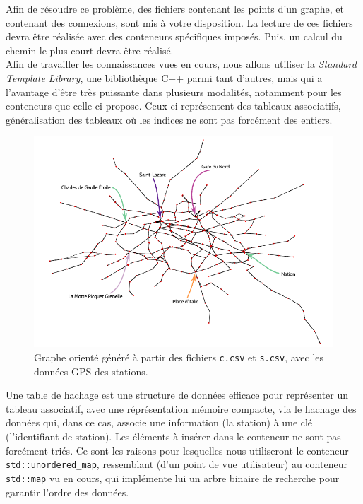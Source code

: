 \documentclass[9pts]{article}
\begin{document}
Afin de résoudre ce problème, des fichiers contenant les points d'un graphe, et contenant des connexions, sont mis à votre disposition. La lecture de ces fichiers devra être réalisée avec des conteneurs spécifiques imposés. Puis, un calcul du chemin le plus court devra être réalisé.\\

Afin de travailler les connaissances vues en cours, nous allons utiliser la \emph{Standard Template Library}, une bibliothèque C++ parmi tant d'autres, mais qui a l'avantage d'être très puissante dans plusieurs modalités, notamment pour les conteneurs que celle-ci propose. Ceux-ci représentent des tableaux associatifs, généralisation des tableaux où les indices ne sont pas forcément des entiers.\\

\begin{figure}[h]
   \centering
   \includegraphics[width=18cm,keepaspectratio]{ratp_graph.pdf}
   \caption{\label{directed_graph} Graphe orienté généré à partir des fichiers \texttt{c.csv} et \texttt{s.csv}, avec les données GPS des stations.}
\end{figure}

Une table de hachage est une structure de données efficace pour représenter un tableau associatif, avec une réprésentation mémoire compacte, via le hachage des données qui, dans ce cas, associe une information (la station) à une clé (l'identifiant de station). Les éléments à insérer dans le conteneur ne sont pas forcément triés. Ce sont les raisons pour lesquelles nous utiliseront le conteneur \texttt{std::unordered\_map}, ressemblant (d'un point de vue utilisateur) au conteneur \texttt{std::map} vu en cours, qui implémente lui un arbre binaire de recherche pour garantir l'ordre des données.
\end{document}
